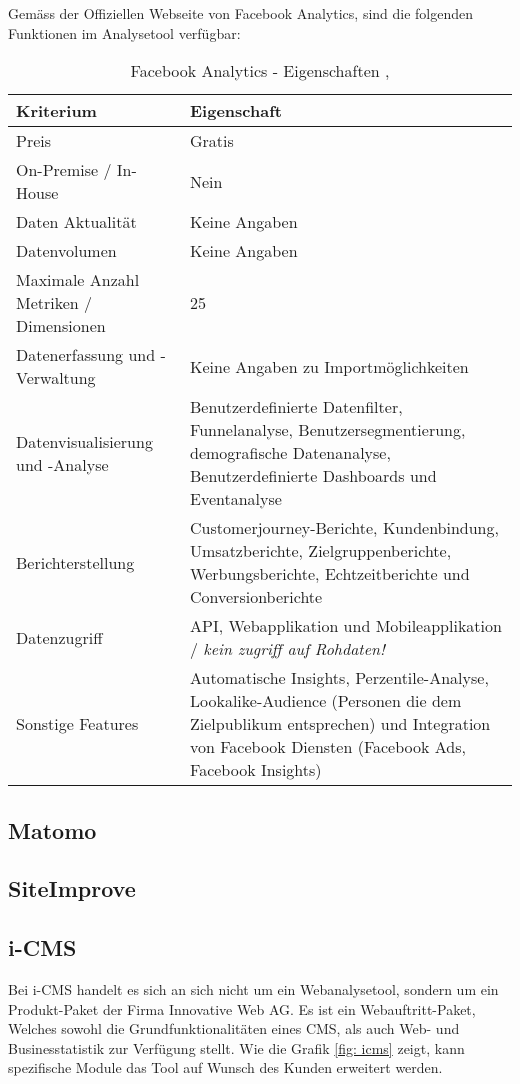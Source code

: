 Gemäss der Offiziellen Webseite von Facebook Analytics, sind die folgenden Funktionen im Analysetool verfügbar:

\begin{table}[h]
	\centering
	\begin{tabular}{ | l | p{12cm} |}
		\hline
		\textbf{Kriterium} & \textbf{Eigenschaft}  \\ 
		\hline
		Preis & Gratis \\
		On-Premise / In-House & Nein \\
		Daten Aktualität & Keine Angaben \\
		Datenvolumen & Keine Angaben \\
		Maximale Anzahl Metriken / Dimensionen & 25 \\
		Datenerfassung und -Verwaltung & Keine Angaben zu Importmöglichkeiten \\
		Datenvisualisierung und -Analyse & Benutzerdefinierte Datenfilter, Funnelanalyse, Benutzersegmentierung,  demografische Datenanalyse, Benutzerdefinierte Dashboards und Eventanalyse \\
    Berichterstellung & Customerjourney-Berichte, Kundenbindung, Umsatzberichte, Zielgruppenberichte, Werbungsberichte, Echtzeitberichte und Conversionberichte \\
		Datenzugriff & API, Webapplikation und Mobileapplikation / \textit{kein zugriff auf Rohdaten!}\\
		Sonstige Features & Automatische Insights, Perzentile-Analyse, Lookalike-Audience (Personen die dem Zielpublikum entsprechen) und Integration von Facebook Diensten (Facebook Ads, Facebook Insights) \\
		\hline  
	\end{tabular}
	\caption{Facebook Analytics - Eigenschaften \parencite{facebookAnalyticsFeatures}, \parencite{facebookAnalyticsHelp}}
	\label{tab: googleAnalyticsFeatures}
\end{table}


\subsection{Matomo}

\subsection{SiteImprove}

\subsection{i-CMS}
Bei i-CMS handelt es sich an sich nicht um ein Webanalysetool, sondern um ein Produkt-Paket der Firma Innovative Web AG. Es ist ein Webauftritt-Paket, Welches sowohl die Grundfunktionalitäten eines CMS, als auch Web- und Businesstatistik zur Verfügung stellt\parencite{iwebwebsiteCMS}. Wie die Grafik \ref{fig: icms} zeigt, kann spezifische Module das Tool auf Wunsch des Kunden erweitert werden.


